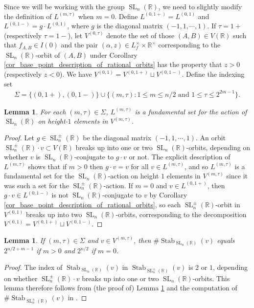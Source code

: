 \documentclass{article} %
\newtheorem{lemma}[proposition]{Lemma}
\numberwithin{equation}{section}
\DeclareMathOperator{\SL}{SL}
\DeclareMathOperator{\Stab}{Stab}
\newcommand{\R}{\mathbb{R}}
\begin{document}
Since we will be working with the group $\SL_n(\R)$, we need to slightly modify the definition of $L^{(m,\tau)}$ when $m=0$.
Define $L^{(0,1+)} = L^{(0,1)}$ and $L^{(0,1-)} = g\cdot L^{(0,1)}$, where $g$ is the diagonal matrix $(-1,1,\cdots,1)$. 
If $\tau = 1+$ (respectively $\tau=1 -$), let $V^{(0,\tau)}$ denote the set of those $(A,B)\in V(\R)$ such that $f_{A,B}\in I(0)$ and the pair $(\alpha, z) \in L_f^{\times} \times \R^{\times}$ corresponding to the $\SL_n(\R)$-orbit of $(A,B)$ under Corollary \ref{cor_base_point_description_of_rational_orbits} has the property that $z>0$ (respectively $z<0$).
We have $V^{(0,1)} = V^{(0,1+)} \sqcup V^{(0,1-)}$.
Define the indexing set
\begin{align}\label{eq_indexingsetsigma}
    \Sigma = \{(0,1+),(0,1-)\} \cup \{(m,\tau) \colon 1\leq m\leq n/2 \text{ and } 1\leq \tau\leq 2^{2m-1}\}.
\end{align}



\begin{lemma}\label{lemma: Lmtau is fundamental set}
    For each $(m,\tau)\in\Sigma$, $L^{(m,\tau)}$ is a fundamental set for the action of $\SL_n(\R)$ on height-$1$ elements in $V^{(m,\tau)}$.
\end{lemma}
\begin{proof}
    Let $g\in \SL_n^{\pm}(\R)$ be the diagonal matrix $(-1,1,\cdots,1)$.
    An orbit $\SL_n^{\pm}(\R)\cdot v\subset V(\R)$ breaks up into one or two $\SL_n(\R)$-orbits, depending on whether $v$ is $\SL_n(\R)$-conjugate to $g\cdot v$ or not.
    The explicit description of $L^{(m,\tau)}$ shows that if $m>0$ then $g\cdot v = v$ for all $v\in L^{(m,\tau)}$, and so $L^{(m,\tau)}$ is a fundamental set for the $\SL_n(\R)$-action on height $1$ elements in $V^{(m,\tau)}$ since it was such a set for the $\SL_n^{\pm}(\R)$-action.
    If $m=0$ and $v\in L^{(0,1+)}$, then $g\cdot v\in L^{(0,1-)}$ is not $\SL_n(\R)$-conjugate to $v$ by Corollary \ref{cor_base_point_description_of_rational_orbits}, so each $\SL_n^{\pm}(\R)$-orbit in $V^{(0,1)}$ breaks up into two $\SL_n(\R)$-orbits, corresponding to the decomposition $V^{(0,1)} = V^{(0,1+)} \sqcup V^{(0,1-)}$.
\end{proof}


\begin{lemma}\label{lemma:realstabilizers}
    If $(m,\tau)\in \Sigma$ and $v\in V^{(m,\tau)}$, then $\#\Stab_{\SL_n(\R)}(v)$ equals $2^{n/2+m-1}$ if $m>0$ and $2^{n/2}$ if $m=0$.
\end{lemma}
\begin{proof}
    The index of $\Stab_{\SL_n(\R)}(v)$ in $\Stab_{\SL_n^{\pm}(\R)}(v)$ is $2$ or $1$, depending on whether $\SL_n^{\pm}(\R)\cdot v$ breaks up into one or two $\SL_n(\R)$-orbits. 
    This lemma therefore follows from (the proof of) Lemma \ref{lemma: Lmtau is fundamental set} and the computation of $\#\Stab_{\SL_n^{\pm}(\R)}(v)$ in \cite[\S3.2]{bhargava2015mosthyperellipticarepointless}.
    \end{proof}
\end{document}
